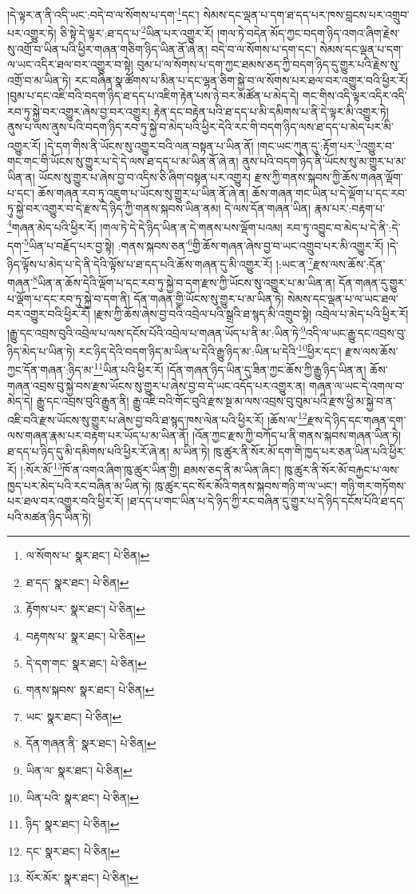 །དེ་ལྟར་ན་ནི་འདི་ཡང་:བདེ་བ་ལ་སོགས་པ་དག་\footnote{ལ་སོགས་པ་  སྣར་ཐང་།  པེ་ཅིན། }དང་། སེམས་དང་ལྡན་པ་དག་ཐ་དད་པར་ཁས་བླངས་པར་འགྲུབ་པར་འགྱུར་ཏེ། ཅི་སྟེ་དེ་ལྟར་:ཐ་དད་པ་\footnote{ཐ་དད་  སྣར་ཐང་།  པེ་ཅིན། }ཡིན་པར་འགྱུར་རོ། །གལ་ཏེ་བདེན་མོད་ཀྱང་བདག་ཉིད་འགའ་ཞིག་རྗེས་སུ་འགྲོ་བ་ཡིན་པའི་ཕྱིར་གཞན་གཅིག་ཉིད་ཡིན་ནོ་ཞེ་ན། བདེ་བ་ལ་སོགས་པ་དག་དང་། སེམས་དང་ལྡན་པ་དག་ལ་ཡང་འདིར་ཐལ་བར་འགྱུར་བ་སྟེ། བུམ་པ་ལ་སོགས་པ་དག་ཀྱང་ཐམས་ཅད་ཀྱི་བདག་ཉིད་དུ་གྱུར་པའི་རྗེས་སུ་འགྲོ་བ་མ་ཡིན་ཏེ། རང་བཞིན་སྣ་ཚོགས་པ་མིན་པ་དང་ལྷན་ཅིག་སྐྱེ་བ་ལ་སོགས་པར་ཐལ་བར་འགྱུར་བའི་ཕྱིར་རོ། །བུམ་པ་དང་འཇི་བའི་བདག་ཉིད་ཐ་དད་པ་འཇིག་རྟེན་པས་ཉེ་བར་མཚོན་པ་མེད་དེ། གང་གིས་འདི་ལྟར་འདིར་འདི་རབ་ཏུ་སྐྱེ་བར་འགྱུར་ཞེས་བྱ་བར་འགྱུར། རྟེན་དང་བརྟེན་པའི་ཐ་དད་པ་མི་དམིགས་པ་ནི་དེ་ལྟར་མི་འགྱུར་ཏེ། ནུས་པ་ལས་ནུས་པའི་བདག་ཉིད་རབ་ཏུ་སྐྱེ་བ་མེད་པའི་ཕྱིར་དེའི་རང་གི་བདག་ཉིད་ལས་ཐ་དད་པ་མེད་པར་མི་འགྱུར་རོ། །དེ་དག་གིས་ནི་ཡོངས་སུ་འགྱུར་བའི་ལན་བསྟན་པ་ཡིན་ནོ། །གང་ཡང་ཀུན་དུ་:རྟོག་པར་\footnote{རྟོགས་པར་  སྣར་ཐང་།  པེ་ཅིན། }འགྱུར་བ་གང་གང་གི་ཡོངས་སུ་གྱུར་པ་དེ་དེ་ལས་ཐ་དད་པ་མ་ཡིན་ནོ་ཞེ་ན། ནུས་པའི་བདག་ཉིད་ནི་ཡོངས་སུ་མ་གྱུར་པ་མ་ཡིན་ན། ཡོངས་སུ་གྱུར་པ་ཞེས་བྱ་བ་འདིས་ཅི་ཞིག་བསྟན་པར་འགྱུར། རྫས་ཀྱི་གནས་སྐབས་ཀྱི་ཆོས་གཞན་ལྡོག་པ་དང་། ཆོས་གཞན་རབ་ཏུ་འཇུག་པ་ཡོངས་སུ་གྱུར་པ་ཡིན་ནོ་ཞེ་ན། ཆོས་གཞན་གང་ཡིན་པ་དེ་ལྡོག་པ་དང་རབ་ཏུ་སྐྱེ་བར་འགྱུར་བ་དེ་རྫས་དེ་ཉིད་ཀྱི་གནས་སྐབས་ཡིན་ནམ། དེ་ལས་དོན་གཞན་ཡིན། རྣམ་པར་:བརྟག་པ་\footnote{བརྟགས་པ་  སྣར་ཐང་།  པེ་ཅིན། }གཞན་མེད་པའི་ཕྱིར་རོ། །གལ་ཏེ་དེ་དེ་ཉིད་ཡིན་ན་དེ་གནས་པས་ལྡོག་པའམ། རབ་ཏུ་འབྱུང་བ་མེད་པ་དེ་ནི་:དེ་དག་\footnote{དེ་དག་གང་  སྣར་ཐང་།  པེ་ཅིན། }ཡིན་པ་བརྗོད་པར་བྱ་སྟེ། :གནས་སྐབས་ཅན་\footnote{གནས་སྐབས་  སྣར་ཐང་།  པེ་ཅིན། }གྱི་ཆོས་གཞན་ཞེས་བྱ་བ་ཡང་འགྲུབ་པར་མི་འགྱུར་རོ། །དེ་ཉིད་ལྟོས་པ་མེད་པ་དེ་ནི་དེའི་ལྟོས་པ་ཐ་དད་པའི་ཆོས་གཞན་དུ་མི་འགྱུར་རོ། །:ཡང་ན་\footnote{ཡང་  སྣར་ཐང་།  པེ་ཅིན། }རྫས་ལས་ཆོས་:དོན་གཞན་\footnote{དོན་གཞན་ནི་  སྣར་ཐང་།  པེ་ཅིན། }ཡིན་ན་ཆོས་དེའི་ལྡོག་པ་དང་རབ་ཏུ་སྐྱེ་བ་དག་རྫས་ཀྱི་ཡོངས་སུ་འགྱུར་པ་མ་ཡིན་ན། དོན་གཞན་དུ་གྱུར་པ་ལྡོག་པ་དང་རབ་ཏུ་སྐྱེ་བ་དག་ནི། དོན་གཞན་གྱི་ཡོངས་སུ་གྱུར་པ་མ་ཡིན་ཏེ། སེམས་དང་ལྡན་པ་ལ་ཡང་ཐལ་བར་འགྱུར་བའི་ཕྱིར་རོ། །རྫས་ཀྱི་ཆོས་ཞེས་བྱ་བའི་འབྲེལ་པའི་སྒྲའི་ཐ་སྙད་མི་འགྲུབ་སྟེ། འབྲེལ་པ་མེད་པའི་ཕྱིར་རོ། །རྒྱུ་དང་འབྲས་བུའི་འབྲེལ་པ་ལས་དངོས་པོའི་འབྲེལ་པ་གཞན་ཡོད་པ་ནི་མ་:ཡིན་ཏེ་\footnote{ཡིན་ལ་  སྣར་ཐང་།  པེ་ཅིན། }འདི་ལ་ཡང་རྒྱུ་དང་འབྲས་བུ་ཉིད་མེད་པ་ཡིན་ཏེ། རང་ཉིད་དེའི་བདག་ཉིད་མ་ཡིན་པ་དེའི་རྒྱུ་ཉིད་མ་:ཡིན་པ་དེའི་\footnote{ཡིན་པའི་  སྣར་ཐང་།  པེ་ཅིན། }ཕྱིར་དང་། རྫས་ལས་ཆོས་ཀྱང་དོན་གཞན་:ཉིད་མ་\footnote{ཉིད་  སྣར་ཐང་།  པེ་ཅིན། }ཡིན་པའི་ཕྱིར་རོ། །དོན་གཞན་ཉིད་ཡིན་དུ་ཟིན་ཀྱང་ཆོས་ཀྱི་རྒྱུ་ཉིད་ཡིན་ན། ཆོས་གཞན་འབྲས་བུ་སྐྱེ་བས་རྫས་ཡོངས་སུ་གྱུར་པ་ཞེས་བྱ་བ་དེ་ཡང་འདོད་པར་འགྱུར་ན། གཞན་ལ་ཡང་དེ་འགལ་བ་མེད་དེ། རྒྱུ་དང་འབྲས་བུའི་རྒྱུན་ནི། རྒྱུ་འཇི་བའི་གོང་བུའི་རྫས་སྔ་མ་ལས་འབྲས་བུ་བུམ་པའི་རྫས་ཕྱི་མ་སྐྱེ་བ་ན་འཇི་བའི་རྫས་ཡོངས་སུ་གྱུར་པ་ཞེས་བྱ་བའི་ཐ་སྙད་ཁས་ལེན་པའི་ཕྱིར་རོ། །ཆོས་ལ་\footnote{དང་  སྣར་ཐང་།  པེ་ཅིན། }རྫས་དེ་ཉིད་དང་གཞན་དག་ལས་གཞན་རྣམ་པར་བརྟག་པར་ཡོད་པ་མ་ཡིན་ནོ། །འོན་ཀྱང་རྫས་ཀྱི་བཀོད་པ་ནི་གནས་སྐབས་གཞན་ཡིན་ཏེ། ཐ་དད་པ་ཉིད་དུ་མི་དམིགས་པའི་ཕྱིར་རོ་ཞེ་ན། མ་ཡིན་ཏེ། ཁུ་ཚུར་ནི་སོར་མོ་དག་གི་ཁྱད་པར་ཅན་ཡིན་པའི་ཕྱིར་རོ། །:སོར་མོ་\footnote{སོར་མོར་  སྣར་ཐང་།  པེ་ཅིན། }ཁོ་ན་འགའ་ཞིག་ཁུ་ཚུར་ཡིན་གྱི། ཐམས་ཅད་ནི་མ་ཡིན་ཞིང་། ཁུ་ཚུར་ནི་སོར་མོ་བརྐྱང་པ་ལས་ཁྱད་པར་མེད་པའི་རང་བཞིན་མ་ཡིན་ཏེ། ཁུ་ཚུར་དང་སོར་མོའི་གནས་སྐབས་གཉི་ག་ལ་ཡང་། གཉི་གར་གཏོགས་པར་ཐལ་བར་འགྱུར་བའི་ཕྱིར་རོ། །ཐ་དད་པ་གང་ཡིན་པ་དེ་ཉིད་ཀྱི་རང་བཞིན་དུ་གྱུར་པ་དེ་ཉིད་དངོས་པོའི་ཐ་དད་པའི་མཚན་ཉིད་ཡིན་ཏེ། 